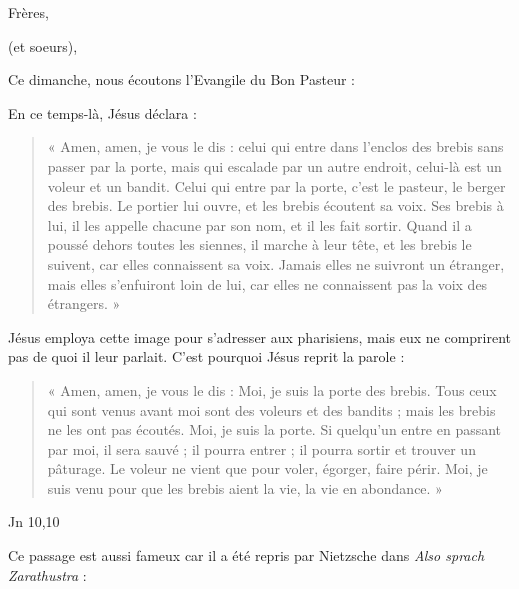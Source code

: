 Frères,





(et soeurs),



Ce dimanche, nous écoutons l'Evangile du Bon Pasteur : 

\begin{singlequote}
En ce temps-là, Jésus déclara :
\begin{quote}
      « Amen, amen, je vous le dis :
celui qui entre dans l’enclos des brebis
sans passer par la porte,
mais qui escalade par un autre endroit,
celui-là est un voleur et un bandit.
    Celui qui entre par la porte,
c’est le pasteur, le berger des brebis.
    Le portier lui ouvre,
et les brebis écoutent sa voix.
Ses brebis à lui, il les appelle chacune par son nom,
et il les fait sortir.
    Quand il a poussé dehors toutes les siennes,
il marche à leur tête,
et les brebis le suivent,
car elles connaissent sa voix.
    Jamais elles ne suivront un étranger,
mais elles s’enfuiront loin de lui,
car elles ne connaissent pas la voix des étrangers. »
\end{quote}
  

    Jésus employa cette image pour s’adresser aux pharisiens,
mais eux ne comprirent pas de quoi il leur parlait.
C’est pourquoi Jésus reprit la parole :
\begin{quote}
    « Amen, amen, je vous le dis :
Moi, je suis la porte des brebis.
    Tous ceux qui sont venus avant moi
sont des voleurs et des bandits ;
mais les brebis ne les ont pas écoutés.
    Moi, je suis la porte.
Si quelqu’un entre en passant par moi,
il sera sauvé ;
il pourra entrer ; il pourra sortir et trouver un pâturage.
Le voleur ne vient que pour voler, égorger, faire périr.
Moi, je suis venu pour que les brebis aient la vie,
la vie en abondance. »
\end{quote}
 Jn 10,10
\end{singlequote}

Ce passage est aussi fameux car il a été repris par Nietzsche dans \textit{Also sprach Zarathustra} :

